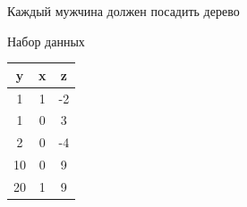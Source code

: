 \documentclass[ignorenonframetext,]{beamer}
\begin{document}
\begin{frame}{Каждый мужчина должен посадить дерево}

Набор данных

\begin{longtable}[c]{@{}ccc@{}}
\toprule
\begin{minipage}[b]{0.05\columnwidth}\centering\strut
y
\strut\end{minipage} &
\begin{minipage}[b]{0.05\columnwidth}\centering\strut
x
\strut\end{minipage} &
\begin{minipage}[b]{0.05\columnwidth}\centering\strut
z
\strut\end{minipage}\tabularnewline
\midrule
\endhead
\begin{minipage}[t]{0.05\columnwidth}\centering\strut
1
\strut\end{minipage} &
\begin{minipage}[t]{0.05\columnwidth}\centering\strut
1
\strut\end{minipage} &
\begin{minipage}[t]{0.05\columnwidth}\centering\strut
-2
\strut\end{minipage}\tabularnewline
\begin{minipage}[t]{0.05\columnwidth}\centering\strut
1
\strut\end{minipage} &
\begin{minipage}[t]{0.05\columnwidth}\centering\strut
0
\strut\end{minipage} &
\begin{minipage}[t]{0.05\columnwidth}\centering\strut
3
\strut\end{minipage}\tabularnewline
\begin{minipage}[t]{0.05\columnwidth}\centering\strut
2
\strut\end{minipage} &
\begin{minipage}[t]{0.05\columnwidth}\centering\strut
0
\strut\end{minipage} &
\begin{minipage}[t]{0.05\columnwidth}\centering\strut
-4
\strut\end{minipage}\tabularnewline
\begin{minipage}[t]{0.05\columnwidth}\centering\strut
10
\strut\end{minipage} &
\begin{minipage}[t]{0.05\columnwidth}\centering\strut
0
\strut\end{minipage} &
\begin{minipage}[t]{0.05\columnwidth}\centering\strut
9
\strut\end{minipage}\tabularnewline
\begin{minipage}[t]{0.05\columnwidth}\centering\strut
20
\strut\end{minipage} &
\begin{minipage}[t]{0.05\columnwidth}\centering\strut
1
\strut\end{minipage} &
\begin{minipage}[t]{0.05\columnwidth}\centering\strut
9
\strut\end{minipage}\tabularnewline
\bottomrule
\end{longtable}


\end{frame}
\end{document}
